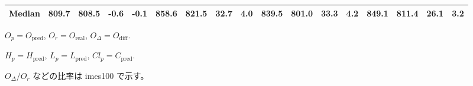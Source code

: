 \begin{threeparttable}
{\begin{tabular}{lrrrrrrrrrrrrrrrr}
 Median & 809.7 & 808.5 &       -0.6 &           -0.1 &  858.6 & 821.5 &       32.7 &            4.0 &  839.5 & 801.0 &       33.3 &            4.2 &  849.1 &  811.4 &        26.1 &              3.2 \\
\bottomrule
\end{tabular}
}
\begin{tablenotes}\footnotesize
\item $O_p=O_{\text{pred}}$, $O_r=O_{\text{real}}$, $O_\Delta=O_{\text{diff}}$.
\item $H_p=H_{\text{pred}}$, $L_p=L_{\text{pred}}$, $Cl_p=C_{\text{pred}}$.
\item $O_\Delta/O_r$ などの比率は 	imes100 で示す。
\end{tablenotes}
\end{threeparttable}
\endgroup
